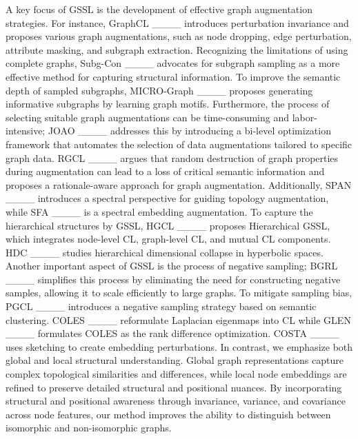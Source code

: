 A key focus of GSSL is the development of effective graph augmentation strategies. For instance, GraphCL ____ introduces perturbation invariance and proposes various graph augmentations, such as node dropping, edge perturbation, attribute masking, and subgraph extraction. Recognizing the limitations of using complete graphs, Subg-Con ____ advocates for subgraph sampling as a more effective method for capturing structural information. To improve the semantic depth of sampled subgraphs, MICRO-Graph ____ proposes generating informative subgraphs by learning graph motifs. Furthermore, the process of selecting suitable graph augmentations can be time-consuming and labor-intensive; JOAO ____ addresses this by introducing a bi-level optimization framework that automates the selection of data augmentations tailored to specific graph data. RGCL ____ argues that random destruction of graph properties during augmentation can lead to a loss of critical semantic information and proposes a rationale-aware approach for graph augmentation. Additionally, SPAN ____ introduces a spectral perspective for guiding topology augmentation,
while SFA ____ is a spectral embedding augmentation. 
%
%
To capture the hierarchical structures by GSSL, HGCL ____ proposes Hierarchical GSSL, which integrates node-level CL, graph-level CL, and mutual CL components. HDC ____ studies hierarchical dimensional collapse in hyperbolic spaces. Another important aspect of GSSL is the process of negative sampling; BGRL ____ simplifies this process by eliminating the need for constructing negative samples, allowing it to scale efficiently to large graphs. To mitigate sampling bias, PGCL ____ introduces a negative sampling strategy based on semantic clustering. 
COLES ____ reformulate Laplacian eigenmaps into CL while GLEN ____ formulates COLES as the rank difference optimization. COSTA ____ uses sketching to create embedding perturbations.
%
In contrast, we emphasize both global and local structural understanding. Global graph representations  capture complex topological similarities and differences, while local node embeddings are refined to preserve detailed structural and positional nuances. By incorporating structural and positional awareness through invariance, variance, and covariance across node features, our method improves the ability to distinguish between isomorphic and non-isomorphic graphs. %



